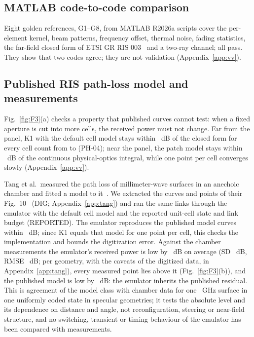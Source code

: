 \subsection{MATLAB code-to-code comparison}\label{sec:vv-matlab}
Eight golden references, G1--G8, from MATLAB R2026a scripts cover the
per-element kernel, beam patterns, frequency offset, thermal noise, fading statistics, the
far-field closed form of ETSI GR RIS 003~\cite{ETSI_GR_RIS003_v121} and a two-ray channel; all
\numGoldenIds{} pass. They show that two codes agree; they are not validation
(Appendix~\ref{app:vv}).

\subsection{Published RIS path-loss model and measurements}\label{sec:vv-tang}
Fig.~\ref{fig:F3}(a) checks a property that published curves cannot test:
when a fixed aperture is cut into more cells, the received power must not change. Far from
the panel, K1 with the default cell model stays within \numRefineFarMaxDevDb~dB of the closed
form for every cell count from \numRefineNmin{} to \numRefineNmax{} (PH-04); near the panel,
the patch model stays within \numRefineNearMaxDevDb~dB of the continuous physical-optics
integral, while one point per cell converges slowly (Appendix~\ref{app:vv}).

Tang et al.\ measured the path loss of millimeter-wave surfaces in an
anechoic chamber and fitted a model to it~\cite{Tang2022mmWave}. We extracted the curves and
points of their Fig.~10~\cite{Tang2022mmWave} (DIG; Appendix~\ref{app:tang}) and ran the same \numTangMeasN{} links
through the emulator with the default cell model and the reported unit-cell state and link
budget (REPORTED). The emulator reproduces the
published model curves within \numTangCurveMaxDevDb~dB; since K1 equals that model for one
point per cell, this checks the implementation and bounds the digitization error. Against the
chamber measurements the emulator's received power is low by \numTangMeasBiasDb~dB on
average (SD \numTangMeasSdDb~dB, RMSE \numTangMeasRmseDb~dB; per geometry, with the caveats of
the digitized data, in Appendix~\ref{app:tang}), every measured point lies above it
(Fig.~\ref{fig:F3}(b)), and the
published model is low by \numTangPubMeasBiasDb~dB: the emulator inherits the published
residual. This is agreement of the model class with chamber data for one \numTangFcGHz~GHz
surface in one uniformly coded state in specular geometries; it tests the absolute level and
its dependence on distance and angle, not reconfiguration, steering or near-field structure,
and no switching, transient or timing behaviour of the emulator has been compared with
measurements.

